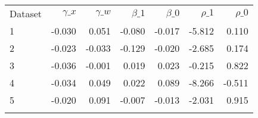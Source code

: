 \begin{center}
\begin{tabular}{lrrrrrr}
\hline \noalign{\smallskip}Dataset & $\gamma\_x$ & $\gamma\_w$ & $\beta\_1$ & $\beta\_0$ & $\rho\_1$ & $\rho\_0$\\
\noalign{\smallskip}\hline \noalign{\smallskip}1 & -0.030 & 0.051 & -0.080 & -0.017 & -5.812 & 0.110\\
2 & -0.023 & -0.033 & -0.129 & -0.020 & -2.685 & 0.174\\
3 & -0.036 & -0.001 & 0.019 & 0.023 & -0.215 & 0.822\\
4 & -0.034 & 0.049 & 0.022 & 0.089 & -8.266 & -0.511\\
5 & -0.020 & 0.091 & -0.007 & -0.013 & -2.031 & 0.915\\
\noalign{\smallskip}\hline\end{tabular}\\
\end{center}
